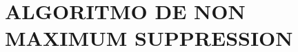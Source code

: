 \documentclass[letterpaper,titlepage,12pt,oneside,spanish,final]{report_eie}
\numberwithin{equation}{chapter}%
\numberwithin{figure}{chapter}%
\numberwithin{table}{chapter}%
\numberwithin{definition}{chapter}%
\numberwithin{lemma}{chapter}%
\numberwithin{theorem}{chapter}%
\numberwithin{corollary}{chapter}%
\numberwithin{condition}{chapter}%
\numberwithin{criterion}{chapter}%
\numberwithin{problem}{chapter}%
\numberwithin{property}{chapter}%
\numberwithin{proposition}{chapter}%
\numberwithin{solution}{chapter}%
\numberwithin{conjecture}{chapter}%
\begin{document}
\chapter{ALGORITMO DE NON MAXIMUM SUPPRESSION}\label{CAP:anexo2}
%




\newpage

\printbibliography[title={REFERENCIAS}]
\newpage




\printindex%
\end{document}
